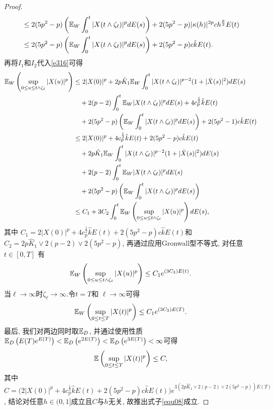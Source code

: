 \begin{proof}
\begin{align*}
    &\leq2(5p^{2}-p)\left(\mathbb{E}_W\int_{0}^{t}{|X(t\wedge \zeta_{\ell})|^{p}dE(s)}\right)+2(5p^{2}-p)|\kappa(h)|^{2p}ch^{\frac{p}{2}}E(t)\\
    &\leq2(5p^{2}-p)\left(\mathbb{E}_W\int_{0}^{t}{|X(t\wedge \zeta_{\ell})|^{p}dE(s)}\right)+2(5p^{2}-p)c\hat{k}E(t).
\end{align*}
再将$I_{1}$和$I_{2}$代入\eqref{e316}可得
\begin{align*}
    \mathbb{E}_W\left(\sup_{0\leq u\leq t\wedge \zeta_{\ell}}|X(u)|^p\right)&\leq
    2|X(0)|^p+2p\hat{K}_1\mathbb{E}_W\int_{0}^{t}{|X(t\wedge \zeta_{\ell})|^{p-2}(1+|\bar{X}(s)|^2)dE(s)}\\
    &\quad +2(p-2)\int_{0}^{t}{\mathbb{E}_W |X(t\wedge \zeta_{\ell})|^p dE(s)}
    +4c_{p}^{\frac{1}{2}}\hat{k}E(t)\\
    &\quad+2(5p^{2}-p)\left(\mathbb{E}_W\int_{0}^{t}{|X(t\wedge \zeta_{\ell})|^{p}dE(s)}\right)+2(5p^{2}-1)c\hat{k}E(t)\\
    &\leq
    2|X(0)|^p+4c_{p}^{\frac{1}{2}}\hat{k}E(t)+2(5p^{2}-p)c\hat{k}E(t)\\
    &\quad+2p\hat{K}_1\mathbb{E}_W\int_{0}^{t}{|X(t\wedge \zeta_{\ell})|^{p-2}(1+|\bar{X}(s)|^2)dE(s)}\\
    &\quad+2(p-2)\int_{0}^{t}{\mathbb{E}_W |X(t\wedge \zeta_{\ell})|^p dE(s)}\\
     &\quad+2(5p^{2}-p)\left(\mathbb{E}_W\int_{0}^{t}{|X(t\wedge \zeta_{\ell})|^{p}dE(s)}\right)\\
    &\leq C_1+3C_2\int_{0}^{t}{\mathbb{E}_W\left(\sup_{0\leq u\leq t\wedge \zeta_{\ell}}|X(u)|^p\right) dE(s)},
\end{align*}
其中
 $C_1=2|X(0)|^p+4c_{p}^{\frac{1}{2}}\hat{k}E(t)+2(5p^{2}-p)c\hat{k}E(t)$和 $C_2=2p\hat{K}_1\vee 2(p-2)\vee2(5p^{2}-p)$, 再通过应用Gronwall型不等式, 对任意$t\in[0,T]$ 有
 \begin{align*}
     \mathbb{E}_W\left(\sup_{0\leq u\leq t\wedge \zeta_{\ell}}|X(u)|^p\right)\leq C_1e^{(3C_2)E(t)}.
 \end{align*}
当$\ell\rightarrow \infty$时$\zeta_{\ell}\rightarrow \infty$.令$t=T$和 $\ell\rightarrow \infty$可得
 \begin{align*}
    \mathbb{E}_W\left(\sup_{0\leq t\leq T}|X(t)|^p\right)\leq C_1e^{(3C_2)E(T)}.
\end{align*}
最后, 我们对两边同时取$\mathbb{E}_D$, 并通过使用性质 $\mathbb{E}_D\left(E(T)e^{E(T)}\right)<\mathbb{E}_D\left(e^{2 E(T)}\right)<\mathbb{E}_D\left(e^{3 E(T)}\right)< \infty$可得
 \begin{align*}
    \mathbb{E}\left(\sup_{0\leq t\leq T}|X(t)|^p\right) \leq C,
\end{align*}
其中 $C=\bigg(2|X(0)|^p+4c_{p}^{\frac{1}{2}}\hat{k}E(t)+2(5p^{2}-p)c\hat{k}E(t)\bigg)e^{3(2p\hat{K}_1\vee 2(p-2)\vee2(5p^{2}-p))E(T)}$, 结论对任意$h\in(0,1]$成立且$C$与$h$无关, 故推出式子\eqref{equ08}成立.
\end{proof}
